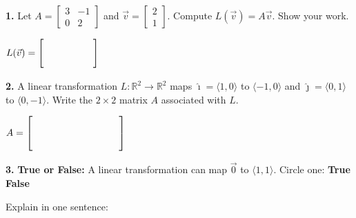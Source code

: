 \documentclass[10pt]{article}
\begin{document}
\namedateperiod
\vspace{0.12in}

\begin{notesbox}
\textbf{1.} Let $A = \begin{bmatrix}3&-1\\0&2\end{bmatrix}$ and
$\vec{v}=\begin{bmatrix}2\\1\end{bmatrix}$.
Compute $L(\vec{v})=A\vec{v}$. Show your work.


\vspace{0.04in}
$L(\vec{v}) = \begin{bmatrix}\hspace{1.8cm}\\[8pt]\hspace{1.8cm}\end{bmatrix}$
\end{notesbox}

\vspace{0.12in}

\begin{notesbox}
\textbf{2.} A linear transformation $L:\mathbb{R}^2\to\mathbb{R}^2$ maps
$\hat{\imath}=\langle1,0\rangle$ to $\langle-1,0\rangle$ and
$\hat{\jmath}=\langle0,1\rangle$ to $\langle0,-1\rangle$.
Write the $2\times2$ matrix $A$ associated with $L$.

\vspace{0.16in}
\hspace{1em}$A = \begin{bmatrix}\hspace{1.4cm}&\hspace{1.4cm}\\[10pt]\hspace{1.4cm}&\hspace{1.4cm}\end{bmatrix}$
\vspace{0.14in}
\end{notesbox}

\vspace{0.12in}

\begin{notesbox}
\textbf{3.} \textbf{True or False:} A linear transformation can map $\vec{0}$
to $\langle1,1\rangle$. Circle one: \quad \textbf{True} \qquad \textbf{False}

\vspace{0.08in}
Explain in one sentence: \writeline
\end{notesbox}
\end{document}

